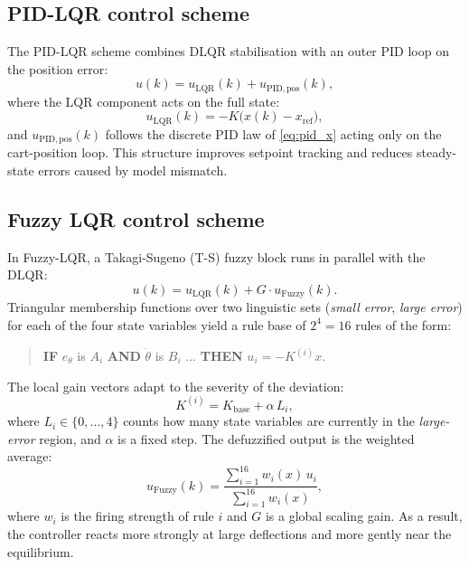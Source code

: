 \documentclass[twocolumn]{svjour3}
\begin{document}
\subsection{PID-LQR control scheme}

The PID-LQR scheme combines DLQR stabilisation with an outer PID loop on the position
error:
\begin{equation}
u(k) = u_\mathrm{LQR}(k) + u_\mathrm{PID,pos}(k),
\end{equation}
where the LQR component acts on the full state:
\begin{equation}
u_\mathrm{LQR}(k) = -K\bigl(x(k) - x_\mathrm{ref}\bigr),
\end{equation}
and $u_\mathrm{PID,pos}(k)$ follows the discrete PID law of \eqref{eq:pid_x} acting only on the
cart-position loop. This structure improves setpoint tracking and reduces steady-state errors
caused by model mismatch.

\subsection{Fuzzy LQR control scheme}

In Fuzzy-LQR, a Takagi-Sugeno (T-S) fuzzy block runs in parallel with the DLQR:
\begin{equation}
u(k) = u_\mathrm{LQR}(k) + G\cdot u_\mathrm{Fuzzy}(k).
\end{equation}
Triangular membership functions over two linguistic sets (\emph{small error},
\emph{large error}) for each of the four state variables yield a rule base of
$2^4=16$ rules of the form:
\begin{quote}
\textbf{IF} $e_\theta$ is $A_i$ \textbf{AND} $\dot\theta$ is $B_i$
$\ldots$ \textbf{THEN} $u_i = -K^{(i)}x$.
\end{quote}
The local gain vectors adapt to the severity of the deviation:
\begin{equation}
K^{(i)} = K_\mathrm{base} + \alpha\,L_i,
\end{equation}
where $L_i\in\{0,\ldots,4\}$ counts how many state variables are currently in the
\emph{large-error} region, and $\alpha$ is a fixed step. The defuzzified output is the
weighted average:
\begin{equation}
u_\mathrm{Fuzzy}(k) = \frac{\displaystyle\sum_{i=1}^{16}w_i(x)\,u_i}
                           {\displaystyle\sum_{i=1}^{16}w_i(x)},
\end{equation}
where $w_i$ is the firing strength of rule $i$ and $G$ is a global scaling gain. As a result,
the controller reacts more strongly at large deflections and more gently near the equilibrium.
\end{document}
